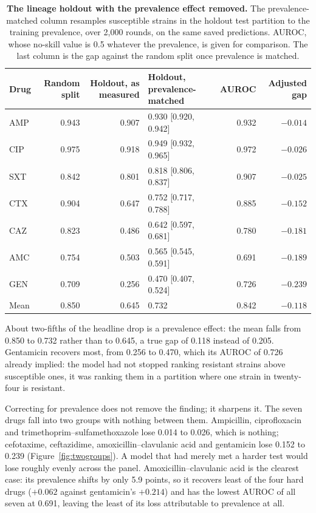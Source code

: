 \begin{table}[t]\centering\footnotesize
\setlength{\tabcolsep}{4pt}
\caption{\textbf{The lineage holdout with the prevalence effect removed.} The prevalence-matched
column resamples susceptible strains in the holdout test partition to the training prevalence, over
2,000 rounds, on the same saved predictions. AUROC, whose no-skill value is 0.5 whatever the
prevalence, is given for comparison. The last column is the gap against the random split once
prevalence is matched.}
\label{tab:previnv}
\begin{tabular}{lrrlrr}
\toprule
Drug & Random split & Holdout, as measured & Holdout, prevalence-matched & AUROC & Adjusted gap \\
\midrule
AMP & 0.943 & 0.907 & 0.930 [0.920, 0.942] & 0.932 & $-0.014$ \\
CIP & 0.975 & 0.918 & 0.949 [0.932, 0.965] & 0.972 & $-0.026$ \\
SXT & 0.842 & 0.801 & 0.818 [0.806, 0.837] & 0.907 & $-0.025$ \\
\midrule
CTX & 0.904 & 0.647 & 0.752 [0.717, 0.788] & 0.885 & $-0.152$ \\
CAZ & 0.823 & 0.486 & 0.642 [0.597, 0.681] & 0.780 & $-0.181$ \\
AMC & 0.754 & 0.503 & 0.565 [0.545, 0.591] & 0.691 & $-0.189$ \\
GEN & 0.709 & 0.256 & 0.470 [0.407, 0.524] & 0.726 & $-0.239$ \\
\midrule
Mean & 0.850 & 0.645 & 0.732 & 0.842 & $-0.118$ \\
\bottomrule
\end{tabular}
\end{table}

About two-fifths of the headline drop is a prevalence effect: the mean falls from 0.850 to 0.732
rather than to 0.645, a true gap of 0.118 instead of 0.205. Gentamicin recovers most, from 0.256 to
0.470, which its AUROC of 0.726 already implied: the model had not stopped ranking resistant strains
above susceptible ones, it was ranking them in a partition where one strain in twenty-four is
resistant.

Correcting for prevalence does not remove the finding; it sharpens it. The seven drugs fall into
two groups with nothing between them. Ampicillin, ciprofloxacin and
trimethoprim--sulfamethoxazole lose 0.014 to 0.026, which is nothing; cefotaxime, ceftazidime,
amoxicillin--clavulanic acid and gentamicin lose 0.152 to 0.239 (Figure~\ref{fig:twogroups}). A
model that had merely met a harder test would lose roughly evenly across the panel.
Amoxicillin--clavulanic acid is the clearest case: its prevalence shifts by only 5.9 points, so it
recovers least of the four hard drugs ($+0.062$ against gentamicin's $+0.214$) and has the lowest
AUROC of all seven at 0.691, leaving the least of its loss attributable to prevalence at all.

